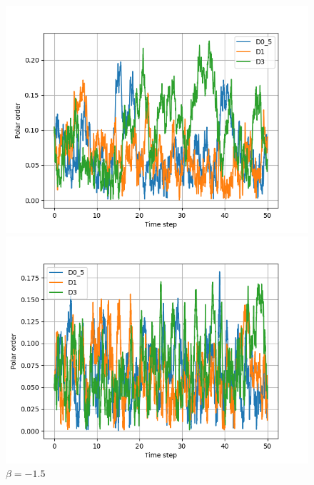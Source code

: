 \documentclass{article}
\begin{document}
\begin{figure}[H]
\begin{minipage}{0.49\textwidth}
        \caption{\footnotesize $\beta = 1.5$}
    \end{minipage}
    \begin{minipage}{0.49\textwidth}
        \includegraphics[width=1\textwidth]{videos/simulations/sim_D/beta3/dens_0_59/combined_polars.png}
        \caption{\footnotesize $\beta = 3$}
    \end{minipage}\hfill
    \begin{minipage}{0.49\textwidth}
        \includegraphics[width=1\textwidth]{videos/simulations/sim_D/betam1_5/dens_0_59/combined_polars.png}
        \caption{\footnotesize $\beta = -1.5$}
    \end{minipage}
\end{figure}
\end{document}
